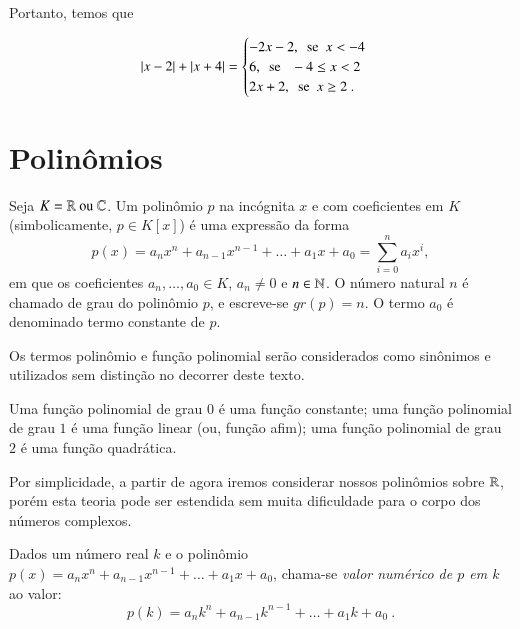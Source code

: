 \begin{exem}
 Portanto, temos que

  \[ \left|x-2\right| + \left|x+4\right| = \begin{cases}
      -2x-2, \ \ \text{se} \ \ x < -4 \\
      6, \ \ \text{se } \ \ -4 \leq x < 2 \\
      2x + 2, \ \ \text{se} \ \ x \geq 2 \ .
     \end{cases}
  \]
 \end{exem}
 
 
 \chapter{Polinômios}

  \vskip0.3cm
 \colorbox{azul}{
 \begin{minipage}{0.9\linewidth}
 \begin{center}
  Seja $K= \mathbb{R} \text{ ou } \mathbb{C}$. Um polinômio $p$ na incógnita $x$ e com coeficientes em $K$ (simbolicamente, $p \in K[x]$) é uma expressão da forma
  \[p(x)= a_nx^n + a_{n-1}x^{n-1}+ \ldots + a_1x+ a_0= \sum_{i=0}^{n} a_ix^i ,\]
  em que os coeficientes $a_n, \ldots, a_0 \in K$, $a_n \neq 0$ e $n \in \mathbb{N}$. O número natural $n$ é chamado de grau do polinômio $p$, e escreve-se $gr(p)= n$. O termo $a_0$ é denominado termo constante de $p$.
 \end{center}
 \end{minipage}}
 \vskip0.3cm

 \begin{obs}
 Os termos polinômio e função polinomial serão considerados como sinônimos e utilizados sem distinção no decorrer deste texto.
 \end{obs}

 Uma função polinomial de grau $0$ é uma função constante; uma função polinomial de grau $1$ é uma função linear (ou, função afim); uma função polinomial de grau $2$ é uma função quadrática.

 Por simplicidade, a partir de agora iremos considerar nossos polinômios sobre $\mathbb{R}$, porém esta teoria pode ser estendida sem muita dificuldade para o corpo dos números complexos.

 \begin{defi}
 Dados um número real $k$ e o polinômio $p(x)= a_nx^n + a_{n-1}x^{n-1}+ \ldots + a_1x+ a_0$, chama-se \emph{valor numérico de $p$ em $k$} ao valor:
 \[p(k)= a_nk^n + a_{n-1}k^{n-1}+ \ldots + a_1k+ a_0 \ .\]
 \end{defi}

